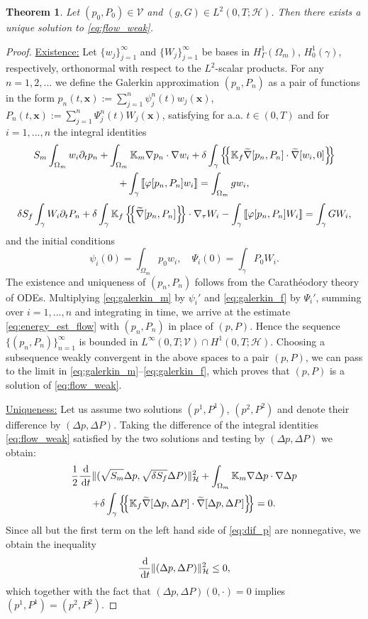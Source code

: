 \documentclass[a4paper]{article}
\newtheorem{theorem}{Theorem}
\def\agrad{\widetilde\nabla}
\def\avg#1{\left\{\mskip-5mu\left\{#1\right\}\mskip-5mu\right\}}
\def\d {\,{\rm d}}
\def\ddt#1{\frac{\d #1}{\d t}}
\def\dt{\prtl_t}
\def\Hf{\mathcal H}
\def\jmp#1{\left\llbracket #1 \right\rrbracket}
\def\norm#1{\|#1\|}
\def\pphi{{\varphi}}
\def\prtl{\partial}
\def\tn#1{{\mathbb{#1}}}    %
\def\Vf{{\mathcal V}} %
\def\vc#1{\mathbf{\boldsymbol{#1}}}     %
\def\xx{\vc x}
\newcommand{\eq}[1]{\begin{equation}#1\end{equation}}
\newcommand{\ml}[1]{\begin{multline}#1\end{multline}}
\begin{document}
\begin{theorem}
Let $(p_0,P_0)\in\Vf$ and $(g,G)\in L^2(0,T;\Hf)$.
Then there exists a unique solution to \eqref{eq:flow_weak}.
\end{theorem}
\begin{proof}
\underline{Existence:}
Let $\{w_j\}_{j=1}^\infty$ and $\{W_j\}_{j=1}^\infty$ be bases in $H^1_\Gamma(\Omega_m)$, $H^1_0(\gamma)$, respectively, orthonormal with respect to the $L^2$-scalar products.
For any $n=1,2,...$ we define the Galerkin approximation $(p_n,P_n)$ as a pair of functions in the form $p_n(t,\xx):=\sum_{j=1}^n\psi_j^n(t)w_j(\xx)$, $P_n(t,\xx):=\sum_{j=1}^n\Psi_j^n(t)W_j(\xx)$, satisfying for a.a. $t\in(0,T)$ and for $i=1,...,n$ the integral identities
\ml{ \label{eq:galerkin_m} S_m\int_{\Omega_m}w_i\dt p_n + \int_{\Omega_m}\tn K_m\nabla p_n\cdot\nabla w_i + \delta\int_\gamma\avg{\tn K_f\agrad[p_n,P_n]\cdot\agrad[w_i,0]}\\
+ \int_\gamma\jmp{\pphi[p_n,P_n]w_i} = \int_{\Omega_m}g w_i, }
\eq{ \label{eq:galerkin_f} \delta S_f\int_\gamma W_i\dt P_n + \delta\int_\gamma\tn K_f\avg{\agrad[p_n,P_n]}\cdot\nabla_\tau W_i - \int_\gamma\jmp{\pphi[p_n,P_n]W_i} = \int_\gamma G W_i, }
and the initial conditions
\[ \psi_i(0)=\int_{\Omega_m}p_0w_i, \quad \Psi_i(0)=\int_\gamma P_0W_i. \]
The existence and uniqueness of $(p_n,P_n)$ follows from the Carath\'eodory theory of ODEs.
Multiplying \eqref{eq:galerkin_m} by $\psi_i'$ and \eqref{eq:galerkin_f} by $\Psi_i'$, summing over $i=1,...,n$ and integrating in time, we arrive at the estimate \eqref{eq:energy_est_flow} with $(p_n,P_n)$ in place of $(p,P)$.
Hence the sequence $\{(p_n,P_n)\}_{n=1}^\infty$ is bounded in $L^\infty(0,T;\Vf)\cap H^1(0,T;\Hf)$.
Choosing a subsequence weakly convergent in the above spaces to a pair $(p,P)$, we can pass to the limit in \eqref{eq:galerkin_m}--\eqref{eq:galerkin_f}, which proves that $(p,P)$ is a solution of \eqref{eq:flow_weak}.

\underline{Uniqueness:}
Let us assume two solutions $(p^1,P^1)$, $(p^2,P^2)$ and denote their difference by $(\Delta p,\Delta P)$.
Taking the difference of the integral identities \eqref{eq:flow_weak} satisfied by the two solutions and testing by $(\Delta p,\Delta P)$ we obtain:
\ml{ \label{eq:dif_p} \frac12\ddt{}\norm{(\sqrt{S_m}\Delta p,\sqrt{\delta S_f}\Delta P)}_\Hf^2
+ \int_{\Omega_m}\tn K_m\nabla\Delta p\cdot\nabla\Delta p\\
+ \delta\int_\gamma\avg{\tn K_f\agrad[\Delta p,\Delta P]\cdot\agrad[\Delta p,\Delta P]} = 0. }
Since all but the first term on the left hand side of \eqref{eq:dif_p} are nonnegative, we obtain the inequality
\eq{ \ddt{}\norm{(\Delta p,\Delta P)}_\Hf^2 \le 0, }
which together with the fact that $(\Delta p,\Delta P)(0,\cdot) = 0$ implies $(p^1,P^1)=(p^2,P^2)$.
\end{proof}
\end{document}
